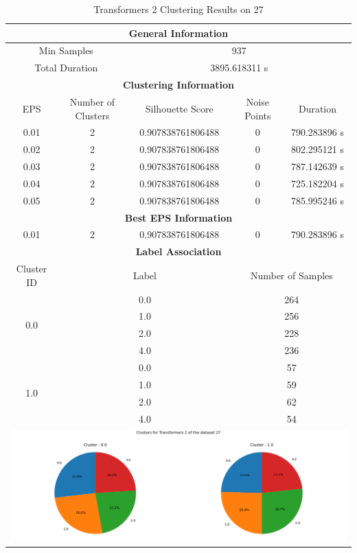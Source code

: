 \begin{longtable}{|c|c|c|c|c|}
\caption{Transformers 2 Clustering Results on 27} \label{tab:27_transformers_2_clustering_results}\\
\hline
\multicolumn{5}{|c|}{\textbf{General Information}} \\
\hline
\multicolumn{2}{|c|}{Min Samples} & \multicolumn{3}{c|}{937} \\
\multicolumn{2}{|c|}{Total Duration} & \multicolumn{3}{c|}{3895.618311 s} \\
\hline
\multicolumn{5}{|c|}{\textbf{Clustering Information}} \\
\hline
EPS & Number of Clusters & Silhouette Score & Noise Points & Duration \\
0.01 & 2 & 0.907838761806488 & 0 & 790.283896 s\\
0.02 & 2 & 0.907838761806488 & 0 & 802.295121 s\\
0.03 & 2 & 0.907838761806488 & 0 & 787.142639 s\\
0.04 & 2 & 0.907838761806488 & 0 & 725.182204 s\\
0.05 & 2 & 0.907838761806488 & 0 & 785.995246 s\\
\hline
\multicolumn{5}{|c|}{\textbf{Best EPS Information}} \\
\hline
0.01 & 2 & 0.907838761806488 & 0 & 790.283896 s\\
\hline
\multicolumn{5}{|c|}{\textbf{Label Association}} \\
\hline
Cluster ID & \multicolumn{2}{c|}{Label} & \multicolumn{2}{c|}{Number of Samples} \\
\hline
\multirow{4}{*}{0.0} & \multicolumn{2}{c|}{0.0} & \multicolumn{2}{c|}{264} \\
& \multicolumn{2}{c|}{1.0} & \multicolumn{2}{c|}{256} \\
& \multicolumn{2}{c|}{2.0} & \multicolumn{2}{c|}{228} \\
& \multicolumn{2}{c|}{4.0} & \multicolumn{2}{c|}{236} \\
\hline
\multirow{4}{*}{1.0} & \multicolumn{2}{c|}{0.0} & \multicolumn{2}{c|}{57} \\
& \multicolumn{2}{c|}{1.0} & \multicolumn{2}{c|}{59} \\
& \multicolumn{2}{c|}{2.0} & \multicolumn{2}{c|}{62} \\
& \multicolumn{2}{c|}{4.0} & \multicolumn{2}{c|}{54} \\
\hline
\multicolumn{5}{|c|}{\includegraphics[width=0.8\linewidth]{img/annexes/27/clustering_pie_charts/Transformers 2.png}} \\
\end{longtable}


